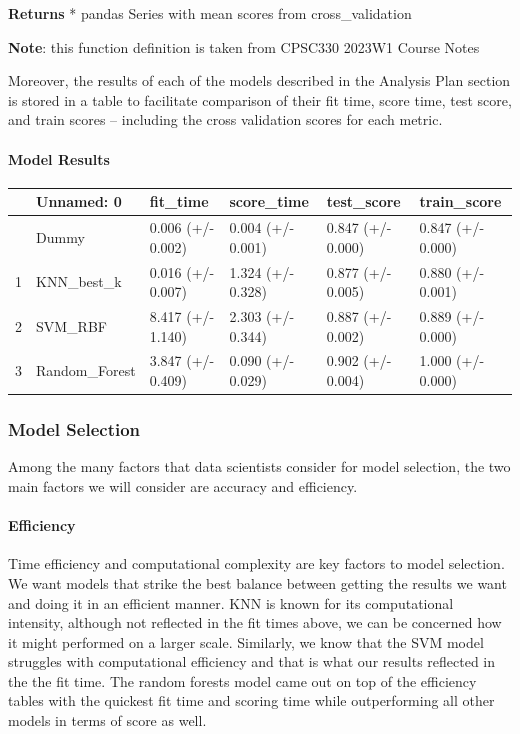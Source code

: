 \documentclass[
  letterpaper,
  DIV=11,
  numbers=noendperiod]{scrartcl}
\let\oldparagraph\paragraph
\renewcommand{\paragraph}[1]{\oldparagraph{#1}\mbox{}}
\begin{document}
\textbf{Returns} * pandas Series with mean scores from cross\_validation

\textbf{Note}: this function definition is taken from CPSC330 2023W1
Course Notes

Moreover, the results of each of the models described in the Analysis
Plan section is stored in a table to facilitate comparison of their fit
time, score time, test score, and train scores -- including the cross
validation scores for each metric.

\paragraph{Model Results}\label{model-results}

\begin{longtable}[]{@{}llllll@{}}
\toprule\noalign{}
& Unnamed: 0 & fit\_time & score\_time & test\_score & train\_score \\
\midrule\noalign{}
\endhead
\bottomrule\noalign{}
\endlastfoot
0 & Dummy & 0.006 (+/- 0.002) & 0.004 (+/- 0.001) & 0.847 (+/- 0.000) &
0.847 (+/- 0.000) \\
1 & KNN\_best\_k & 0.016 (+/- 0.007) & 1.324 (+/- 0.328) & 0.877 (+/-
0.005) & 0.880 (+/- 0.001) \\
2 & SVM\_RBF & 8.417 (+/- 1.140) & 2.303 (+/- 0.344) & 0.887 (+/- 0.002)
& 0.889 (+/- 0.000) \\
3 & Random\_Forest & 3.847 (+/- 0.409) & 0.090 (+/- 0.029) & 0.902 (+/-
0.004) & 1.000 (+/- 0.000) \\
\end{longtable}

\subsubsection{Model Selection}\label{model-selection}

Among the many factors that data scientists consider for model
selection, the two main factors we will consider are accuracy and
efficiency.

\paragraph{Efficiency}\label{efficiency}

Time efficiency and computational complexity are key factors to model
selection. We want models that strike the best balance between getting
the results we want and doing it in an efficient manner. KNN is known
for its computational intensity, although not reflected in the fit times
above, we can be concerned how it might performed on a larger scale.
Similarly, we know that the SVM model struggles with computational
efficiency and that is what our results reflected in the the fit time.
The random forests model came out on top of the efficiency tables with
the quickest fit time and scoring time while outperforming all other
models in terms of score as well.
\end{document}
